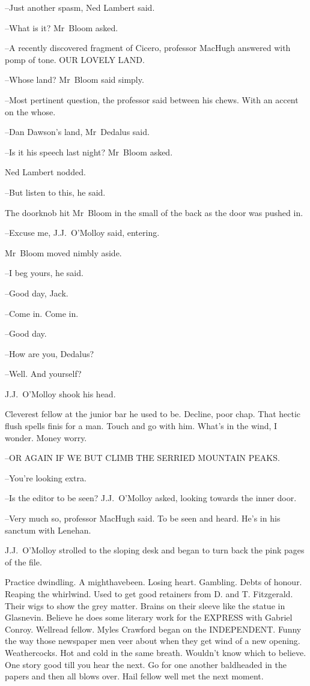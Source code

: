 --Just another spasm,
Ned Lambert said.

--What is it?
Mr~Bloom asked.

--A recently discovered fragment of Cicero,
professor MacHugh answered
with pomp of tone.
OUR LOVELY LAND.



--Whose land?
Mr~Bloom said simply.

--Most pertinent question,
the professor said between his chews.
With an accent on the whose.

--Dan Dawson's land,
Mr~Dedalus said.

--Is it his speech last night?
Mr~Bloom asked.

Ned Lambert nodded.

--But listen to this,
he said.

The doorknob hit Mr~Bloom in the small of the back
as the door was pushed in.

--Excuse me,
J.J.~O'Molloy said,
entering.

Mr~Bloom moved nimbly aside.

--I beg yours,
he said.

--Good day,
Jack.

--Come in.
Come in.

--Good day.

--How are you, Dedalus?

--Well. And yourself?

J.J.~O'Molloy shook his head.



Cleverest fellow at the junior bar he used to be.
Decline, poor chap.
That hectic flush spells finis for a man.
Touch and go with him.
What's in the wind, I wonder.
Money worry.

--OR AGAIN IF WE BUT CLIMB THE SERRIED MOUNTAIN PEAKS.

--You're looking extra.

--Is the editor to be seen?
J.J.~O'Molloy asked,
looking towards the inner door.

--Very much so,
professor MacHugh said.
To be seen and heard.
He's in his sanctum with Lenehan.

J.J.~O'Molloy strolled to the sloping desk
and began to turn back the pink pages of the file.

Practice dwindling.
A mighthavebeen.
Losing heart.
Gambling.
Debts of honour.
Reaping the whirlwind.
Used to get good retainers from D. and T. Fitzgerald.
Their wigs to show the grey matter.
Brains on their sleeve like the statue in Glasnevin.
Believe he does some literary work for the EXPRESS with Gabriel Conroy.
Wellread fellow.
Myles Crawford began on the INDEPENDENT.
Funny the way those newspaper men veer about when they get wind of a new opening.
Weathercocks.
Hot and cold in the same breath.
Wouldn't know which to believe.
One story good till you hear the next.
Go for one another baldheaded in the papers and then all blows over.
Hail fellow well met the next moment.

